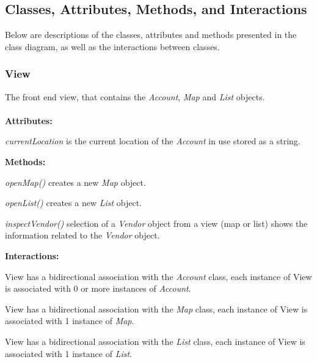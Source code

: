 \subsection{Classes, Attributes, Methods, and Interactions}
Below are descriptions of the classes, attributes and methods presented in the class diagram, as well as the interactions between classes.

\subsubsection{View}
The front end view, that contains the \emph{Account}, \emph{Map} and \emph{List} objects. \\ \\
\textbf{Attributes:}
\begin{description}
\item\textit{currentLocation} is the current location of the \emph{Account} in use stored as a string.
\end{description}
\textbf{Methods:}
\begin{description}
\item\textit{openMap()} creates a new \emph{Map} object.
\item\textit{openList()} creates a new \emph{List} object.
\item\textit{inspectVendor()} selection of a \emph{Vendor} object from a view (map or list) shows the information related to the \emph{Vendor} object.
\end{description}
\textbf{Interactions:}
\begin{description}
\item View has a bidirectional association with the \emph{Account} class, each instance of View is associated with 0 or more instances of \emph{Account}.
\item View has a bidirectional association with the \emph{Map} class, each instance of View is associated with 1 instance of \emph{Map}.
\item View has a bidirectional association with the \emph{List} class, each instance of View is associated with 1 instance of \emph{List}.
\end{description}
\vspace{.2cm}
